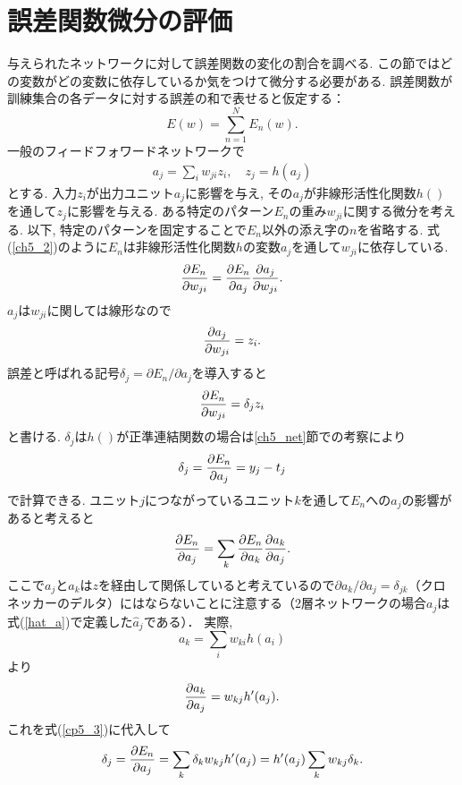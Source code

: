 \section{誤差関数微分の評価}
与えられたネットワークに対して誤差関数の変化の割合を調べる.
この節ではどの変数がどの変数に依存しているか気をつけて微分する必要がある.
誤差関数が訓練集合の各データに対する誤差の和で表せると仮定する：
$$
E(w)=\sum_{n=1}^N E_n(w).
$$
一般のフィードフォワードネットワークで
\begin{eqnarray}\label{ch5_2}
a_j=\sum_i w_{ji} z_i, \quad z_j=h(a_j)
\end{eqnarray}
とする. 入力$z_i$が出力ユニット$a_j$に影響を与え, その$a_j$が非線形活性化関数$h()$を通して$z_j$に影響を与える.
ある特定のパターン$E_n$の重み$w_{ji}$に関する微分を考える.
以下, 特定のパターンを固定することで$E_n$以外の添え字の$n$を省略する.
式(\ref{ch5_2})のように$E_n$は非線形活性化関数$h$の変数$a_j$を通して$w_{ji}$に依存している.
$$
\diff{w_{ji}}{E_n}=\diff{a_j}{E_n}\diff{w_{ji}}{a_j}.
$$
$a_j$は$w_{ji}$に関しては線形なので
$$
\diff{w_{ji}}{a_j}=z_i.
$$
誤差と呼ばれる記号$\delta_j = \partial E_n / \partial a_j$を導入すると
$$
\diff{w_{ji}}{E_n}=\delta_j z_i
$$
と書ける. $\delta_j$は$h()$が正準連結関数の場合は\ref{ch5_net}節での考察により
$$
\delta_j=\diff{a_j}{E_n}=y_j-t_j
$$
で計算できる.
ユニット$j$につながっているユニット$k$を通して$E_n$への$a_j$の影響があると考えると
\begin{eqnarray}\label{cp5_3}
\diff{a_j}{E_n}=\sum_k \diff{a_k}{E_n}\diff{a_j}{a_k}.
\end{eqnarray}
ここで$a_j$と$a_k$は$z$を経由して関係していると考えているので$\partial a_k / \partial a_j=\delta_{jk}$（クロネッカーのデルタ）にはならないことに注意する（2層ネットワークの場合$a_j$は式(\ref{hat_a})で定義した$\hat{a}_j$である）．
実際,
$$
a_k=\sum_i w_{ki} h(a_i)
$$
より
$$
\diff{a_j}{a_k}=w_{kj} h'(a_j).
$$
これを式(\ref{cp5_3})に代入して
$$
\delta_j=\diff{a_j}{E_n}=\sum_k \delta_k w_{kj} h'(a_j)=h'(a_j)\sum_k w_{kj} \delta_k.
$$
\vspace{0pt}

